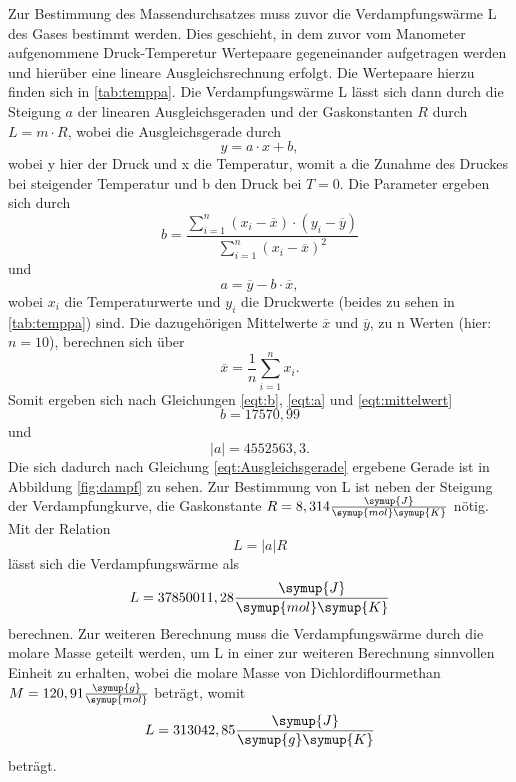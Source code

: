 Zur Bestimmung des Massendurchsatzes muss zuvor die Verdampfungswärme L des Gases bestimmt werden. Dies geschieht, in dem zuvor vom Manometer aufgenommene
Druck-Temperetur Wertepaare gegeneinander aufgetragen werden und hierüber eine lineare Ausgleichsrechnung erfolgt. Die Wertepaare hierzu finden sich in \autoref {tab:temppa}.
Die Verdampfungswärme L lässt sich dann durch die Steigung $a$ der linearen Ausgleichsgeraden und der Gaskonstanten $R$ durch $L = m \cdot R$, wobei die Ausgleichsgerade durch
\begin{equation}
  \label{eqt:Ausgleichsgerade}
  y = a \cdot x + b,
\end{equation}
wobei y hier der Druck und x die Temperatur, womit a die Zunahme des Druckes bei steigender Temperatur und b den Druck bei $ T = 0$.
Die Parameter ergeben sich durch
\begin{equation}
\label{eqt:b}
  b = \frac {\sum_{i=1}^n (x_i - \overline{x}) \cdot (y_i - \overline{y})}{\sum_{i=1}^n (x_i - \overline{x})^2}
\end{equation}
und 
\begin{equation}
\label{eqt:a}
  a = \overline{y} - b \cdot \overline{x}, 
\end{equation}
wobei $x_i$ die Temperaturwerte und $y_i$ die Druckwerte (beides zu sehen in \autoref{tab:temppa}) sind. Die dazugehörigen Mittelwerte $\overline{x}$ und $\overline{y}$, zu n Werten (hier: $n = 10$), berechnen sich über
\begin{equation}
\label{eqt:mittelwert}
  \overline{x} = \frac {1}{n} \sum_{i=1}^n x_i . 
\end{equation}
Somit ergeben sich nach Gleichungen \eqref{eqt:b}, \eqref{eqt:a} und \eqref{eqt:mittelwert}
\begin{equation}
    b = 17570,99
\end{equation}
und 
\begin{equation}
 \lvert a \rvert = 4552563,3 . 
\end{equation}
Die sich dadurch nach Gleichung \eqref{eqt:Ausgleichsgerade} ergebene Gerade ist in Abbildung \ref{fig:dampf} zu sehen.
Zur Bestimmung von L ist neben der Steigung der Verdampfungkurve, die Gaskonstante $R = 8,314 \frac{\symup{J}}{\symup{mol} \symup{K}}$ nötig.
Mit der Relation
\begin{equation}
  L = \lvert a \rvert R
\end{equation}
lässt sich die Verdampfungswärme als
\begin{equation}
  L = 37850011,28 \frac{\symup{J}}{\symup{mol} \symup{K}}
\end{equation}
berechnen.
Zur weiteren Berechnung muss die Verdampfungswärme durch die molare Masse geteilt werden, um L in einer zur weiteren Berechnung sinnvollen Einheit zu erhalten, wobei 
die molare Masse von Dichlordiflourmethan $M = 120,91 \frac{\symup{g}}{\symup{mol} }$ \cite{chemie} beträgt, womit
\begin{equation}
  L =  313042,85 \frac{\symup{J}}{\symup{g} \symup{K}}
\end{equation}
beträgt. 

